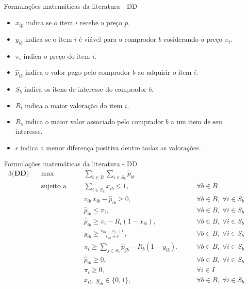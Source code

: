 \documentclass{beamer}
\begin{document}
\begin{frame}[shrink]{Formulações matemáticas da literatura - DD}
    \begin{center}
        
        \begin{itemize}
            \item $x_{ip}$ indica se o item $i$ recebe o preço $p$.
            \item $y_{ib}$ indica se o item $i$ é viável para o comprador $b$ cosiderando o preço $\pi_i$.
            \item $\pi_i$ indica o preço do item $i$.
            \item $\hat{p}_{ib}$ indica o valor pago pelo comprador $b$ ao adquirir o item $i$.
            \item $S_b$ indica os itens de interesse do comprador $b$.
            \item $R_i$ indica a maior valoração do item $i$.
            \item $R_b$ indica o maior valor associado pelo comprador $b$ a um item de seu interesse.
            \item $\epsilon$ indica a menor diferença positiva dentre todas as valorações.
        \end{itemize}
    \end{center}

\end{frame}


\begin{frame}[shrink]{Formulações matemáticas da literatura - DD}
    \footnotesize
    \begin{alignat}{3}
    \textbf{(DD)} \quad
    &\max \quad && \sum_{b \in B} \sum_{i \in S_b} \hat{p}_{ib}\\
    &\text{sujeito a} \quad
    && \sum_{i \in S_b} x_{ib} \leq 1, \quad && \forall b \in B \label{dd_1}\\
    & && v_{ib}\,x_{ib} - \hat{p}_{ib} \geq 0, \quad && \forall b \in B,\;\forall i \in S_b \label{dd_2}\\
    & && \hat{p}_{ib} \leq \pi_i, \quad && \forall b \in B,\;\forall i \in S_b \label{dd_3}\\
    & && \hat{p}_{ib} \geq \pi_i - R_i(1 - x_{ib}), \quad && \forall b \in B,\;\forall i \in S_b \label{dd_4}\\
    & && y_{ib} \geq \frac{v_{ib} - \pi_i + \epsilon}{v_{ib} + \epsilon}, \quad && \forall b \in B,\;\forall i \in S_b \label{dd_viab}\\
    & && \pi_i \geq \sum_{j \in S_b} \hat{p}_{jb} - R_b(1 - y_{ib}), \quad && \forall b \in B,\;\forall i \in S_b \label{dd_pcm}\\
    & && \hat{p}_{ib} \geq 0, \quad && \forall b \in B,\;\forall i \in S_b \label{dd_5}\\
    & && \pi_i \geq 0, \quad && \forall i \in I \label{dd_6}\\
    & && x_{ib},\,y_{ib} \in \{0,1\}, \quad && \forall b \in B,\;\forall i \in S_b \label{dd_7}
    \end{alignat}

\end{frame}
\end{document}

